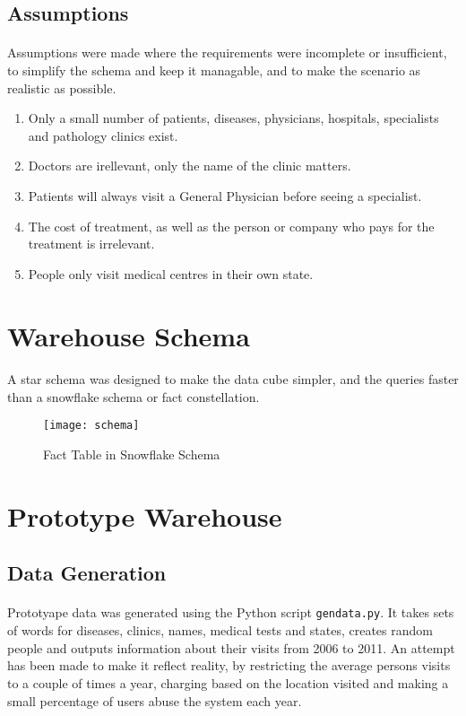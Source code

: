 \documentclass[a4paper,12pt,openbib]{article}
\begin{document}
\subsection*{Assumptions}
\paragraph{}
Assumptions were made where the requirements were incomplete or insufficient, to simplify the schema and keep it managable, and to make the scenario as realistic as possible.
\begin{enumerate}
	\item Only a small number of patients, diseases, physicians, hospitals, specialists and pathology clinics exist.
	\item Doctors are irellevant, only the name of the clinic matters.
	\item Patients will always visit a General Physician before seeing a specialist.
	\item The cost of treatment, as well as the person or company who pays for the treatment is irrelevant.
	\item People only visit medical centres in their own state.
\end{enumerate}

\section*{Warehouse Schema}
\paragraph{}
A star schema was designed to make the data cube simpler, and the queries faster than a snowflake schema or fact constellation.
\begin{figure}[ht!]
	\centering
	\texttt{[image: schema]}
	\caption{Fact Table in Snowflake Schema}
	\label{fig:schema}
\end{figure}

\section*{Prototype Warehouse}
\subsection*{Data Generation}
\paragraph{}
	Prototyape data was generated using the Python script \texttt{gendata.py}.
	It takes sets of words for diseases, clinics, names, medical tests and states, creates random people and outputs information about their visits from 2006 to 2011.
	An attempt has been made to make it reflect reality, by restricting the average persons visits to a couple of times a year, charging based on the location visited and making a small percentage of users abuse the system each year.
\end{document}
